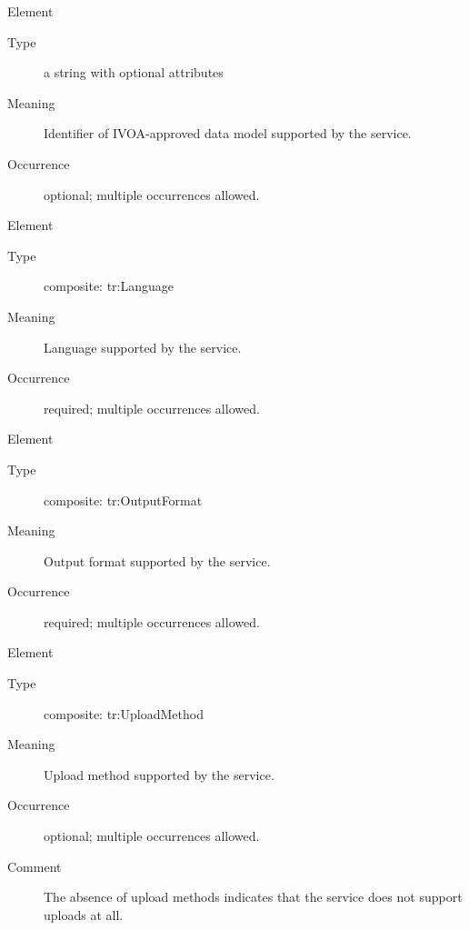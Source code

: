 \documentclass{ivoa}
\begin{document}
\begin{bigdescription}\item[Element \xmlel{dataModel}]
\begin{description}
\item[Type\quad] a string with optional attributes
\item[Meaning\quad] 
              Identifier of IVOA-approved data model supported by the 
              service.
              
\item[Occurrence\quad] optional; multiple occurrences allowed.

\end{description}
\item[Element \xmlel{language}]
\begin{description}
\item[Type\quad] composite: tr:Language
\item[Meaning\quad] 
              Language supported by the service.
              
\item[Occurrence\quad] required; multiple occurrences allowed.

\end{description}
\item[Element \xmlel{outputFormat}]
\begin{description}
\item[Type\quad] composite: tr:OutputFormat
\item[Meaning\quad] 
                Output format supported by the service.
              
\item[Occurrence\quad] required; multiple occurrences allowed.

\end{description}
\item[Element \xmlel{uploadMethod}]
\begin{description}
\item[Type\quad] composite: tr:UploadMethod
\item[Meaning\quad] 
                Upload method supported by the service.
              
\item[Occurrence\quad] optional; multiple occurrences allowed.
\item[Comment\quad] 
                The absence of upload methods indicates
                that the service does not support uploads
                at all.
              


\end{description}
\end{bigdescription}
\end{document}
